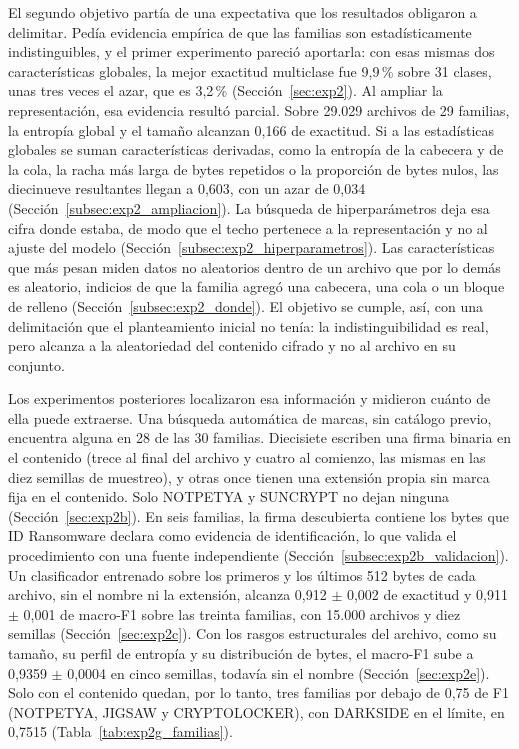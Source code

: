 El segundo objetivo partía de una expectativa que los resultados obligaron a delimitar. Pedía evidencia empírica de que las familias son estadísticamente indistinguibles, y el primer experimento pareció aportarla: con esas mismas dos características globales, la mejor exactitud multiclase fue 9,9\,\% sobre 31 clases, unas tres veces el azar, que es 3,2\,\% (Sección~\ref{sec:exp2}). Al ampliar la representación, esa evidencia resultó parcial. Sobre 29.029 archivos de 29 familias, la entropía global y el tamaño alcanzan 0,166 de exactitud. Si a las estadísticas globales se suman características derivadas, como la entropía de la cabecera y de la cola, la racha más larga de bytes repetidos o la proporción de bytes nulos, las diecinueve resultantes llegan a 0,603, con un azar de 0,034 (Sección~\ref{subsec:exp2_ampliacion}). La búsqueda de hiperparámetros deja esa cifra donde estaba, de modo que el techo pertenece a la representación y no al ajuste del modelo (Sección~\ref{subsec:exp2_hiperparametros}). Las características que más pesan miden datos no aleatorios dentro de un archivo que por lo demás es aleatorio, indicios de que la familia agregó una cabecera, una cola o un bloque de relleno (Sección~\ref{subsec:exp2_donde}). El objetivo se cumple, así, con una delimitación que el planteamiento inicial no tenía: la indistinguibilidad es real, pero alcanza a la aleatoriedad del contenido cifrado y no al archivo en su conjunto.

Los experimentos posteriores localizaron esa información y midieron cuánto de ella puede extraerse. Una búsqueda automática de marcas, sin catálogo previo, encuentra alguna en 28 de las 30 familias. Diecisiete escriben una firma binaria en el contenido (trece al final del archivo y cuatro al comienzo, las mismas en las diez semillas de muestreo), y otras once tienen una extensión propia sin marca fija en el contenido. Solo NOTPETYA y SUNCRYPT no dejan ninguna (Sección~\ref{sec:exp2b}). En seis familias, la firma descubierta contiene los bytes que ID Ransomware declara como evidencia de identificación, lo que valida el procedimiento con una fuente independiente (Sección~\ref{subsec:exp2b_validacion}). Un clasificador entrenado sobre los primeros y los últimos 512 bytes de cada archivo, sin el nombre ni la extensión, alcanza 0,912 $\pm$ 0,002 de exactitud y 0,911 $\pm$ 0,001 de macro-F1 sobre las treinta familias, con 15.000 archivos y diez semillas (Sección~\ref{sec:exp2c}). Con los rasgos estructurales del archivo, como su tamaño, su perfil de entropía y su distribución de bytes, el macro-F1 sube a 0,9359 $\pm$ 0,0004 en cinco semillas, todavía sin el nombre (Sección~\ref{sec:exp2e}). Solo con el contenido quedan, por lo tanto, tres familias por debajo de 0,75 de F1 (NOTPETYA, JIGSAW y CRYPTOLOCKER), con DARKSIDE en el límite, en 0,7515 (Tabla~\ref{tab:exp2g_familias}).

